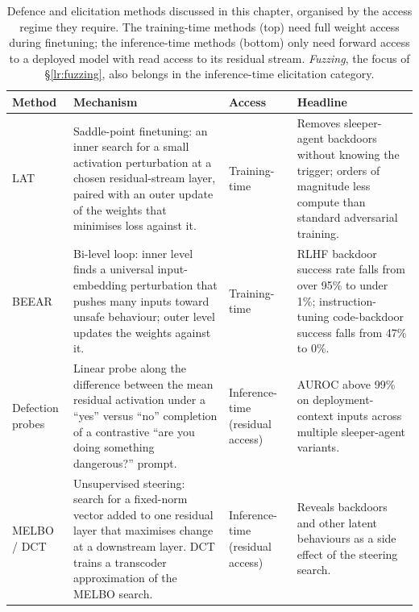 \begin{table}[h]
\centering
\footnotesize
\begin{tabular}{@{}p{2.4cm} p{4.4cm} p{2.0cm} p{4.4cm}@{}}
\toprule
\textbf{Method} & \textbf{Mechanism} & \textbf{Access} & \textbf{Headline} \\
\midrule
LAT~\citep{sheshadri2024} & Saddle-point finetuning: an inner search for a small activation perturbation at a chosen residual-stream layer, paired with an outer update of the weights that minimises loss against it. & Training-time & Removes sleeper-agent backdoors without knowing the trigger; orders of magnitude less compute than standard adversarial training. \\
\addlinespace
BEEAR~\citep{zeng2024} & Bi-level loop: inner level finds a universal input-embedding perturbation that pushes many inputs toward unsafe behaviour; outer level updates the weights against it. & Training-time & RLHF backdoor success rate falls from over 95\% to under 1\%; instruction-tuning code-backdoor success falls from 47\% to 0\%. \\
\midrule
Defection probes~\citep{macdiarmid2024} & Linear probe along the difference between the mean residual activation under a ``yes'' versus ``no'' completion of a contrastive ``are you doing something dangerous?'' prompt. & Inference-time (residual access) & AUROC above 99\% on deployment-context inputs across multiple sleeper-agent variants. \\
\midrule
MELBO / DCT~\citep{mack2024} & Unsupervised steering: search for a fixed-norm vector added to one residual layer that maximises change at a downstream layer. DCT trains a transcoder approximation of the MELBO search. & Inference-time (residual access) & Reveals backdoors and other latent behaviours as a side effect of the steering search. \\
\bottomrule
\end{tabular}
\caption{Defence and elicitation methods discussed in this chapter, organised by the access regime they require. The training-time methods (top) need full weight access during finetuning; the inference-time methods (bottom) only need forward access to a deployed model with read access to its residual stream. \emph{Fuzzing}, the focus of \S\ref{lr:fuzzing}, also belongs in the inference-time elicitation category.}
\label{tab:defences}
\end{table}
